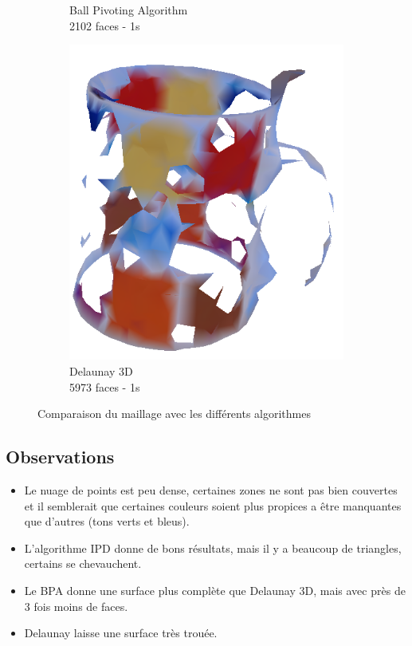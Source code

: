 \documentclass[a4paper,10pt]{report}
\begin{document}
\begin{figure}[h!]
\begin{subfigure}[b]{0.3\textwidth}
        \caption{Ball Pivoting Algorithm\\2102 faces - 1s}
    \end{subfigure}
    \begin{subfigure}[b]{0.3\textwidth}
	    \includegraphics[width=\textwidth]{results/defaults-delaunay.png}
        \caption{Delaunay 3D\\5973 faces - 1s}
    \end{subfigure}
    \caption{Comparaison du maillage avec les différents algorithmes}
\end{figure}

\subsection{Observations}
\begin{itemize}
	\item Le nuage de points est peu dense, certaines zones ne sont pas bien couvertes et il semblerait que certaines couleurs soient plus propices a être manquantes que d'autres (tons verts et bleus).
    \item L'algorithme IPD donne de bons résultats, mais il y a beaucoup de triangles, certains se chevauchent.
    \item Le BPA donne une surface plus complète que Delaunay 3D, mais avec près de 3 fois moins de faces.
    \item Delaunay laisse une surface très trouée.
\end{itemize}
\end{document}
